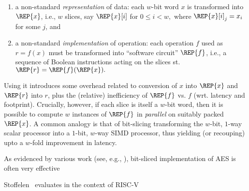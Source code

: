 \begin{enumerate}
\item a non-standard {\em representation}
      of data:
      each $w$-bit word $x$ is transformed into $\REP{x}$,
      i.e.,
      $w$ slices, say $\REP{x}[ i ]$ for
      $
      0 \leq i < w ,
      $
      where $\REP{x}[ i ]_j = x_i$ for some $j$,
      and
\item a non-standard {\em implementation}
      of operation:
      each operation $f$ used as
      $
          {r} =     {f}(     {x} )
      $
      must be transformed into ``software circuit'' $\REP{f}$,
      i.e.,
      a sequence of Boolean instructions acting on the slices st.
      $
      \REP{r} = \REP{f}( \REP{x} ) .
      $
\end{enumerate}

\noindent
Using it introduces some overhead related to conversion of $x$ into
$\REP{x}$ and $\REP{r}$ into $r$, plus the (relative) inefficiency
of $\REP{f}$ vs. $f$ (wrt. latency and footprint).
Crucially, however, if each slice is itself a $w$-bit word, then it
is possible to compute $w$ instances of $\REP{f}$ in {\em parallel}
on suitably packed $\REP{x}$.
A common analogy is that of bit-slicing transforming the 
$w$-bit, $1$-way scalar processor 
into a 
$1$-bit, $w$-way SIMD   processor, 
thus yielding (or recouping) upto a $w$-fold improvement in latency.


As evidenced by various work
(see, e.g., \cite{MatNak:07,Konighofer:08,KasSch:09}),
bit-sliced implementation of AES is often very effective 

Stoffelen~\cite{Stoffelen:19}
evaluates in the context of RISC-V

